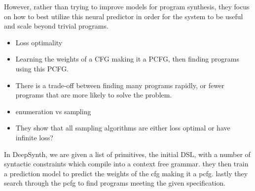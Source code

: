 However, rather than trying to improve models for program synthesis, they focus on how to best utilize this neural predictor in order for the system to be useful and scale beyond trivial programs.



\begin{itemize}
    \item Loss optimality
    \item Learning the weights of a CFG making it a PCFG, then finding programs using this PCFG. 
    \item There is a trade-off between finding many programs rapidly, or fewer programs that are more likely to solve the problem.
    \item enumeration vs sampling
    \item They show that all sampling algorithms are either loss optimal or have infinite loss?
\end{itemize}

In DeepSynth, we are given a list of primitives, the initial DSL, with a number of syntactic constraints which compile into a context free grammar. they then train a prediction model to predict the weights of the cfg making it a pcfg. lastly they search through the pcfg to find programs meeting the given specification.


